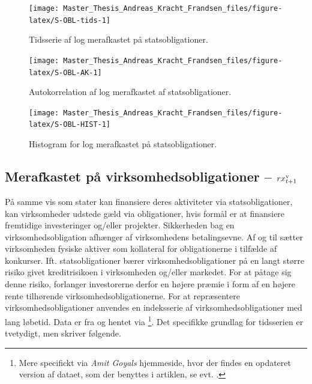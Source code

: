 \documentclass[
  a4paper,
  oneside]{memoir}
\begin{document}
\begin{figure}[H]

{\centering \texttt{[image: Master\_Thesis\_Andreas\_Kracht\_Frandsen\_files/figure-latex/S-OBL-tids-1]} 

}

\caption{Tidsserie af log merafkastet på statsobligationer.}\label{fig:S-OBL-tids}
\end{figure}

\begin{figure}[H]

{\centering \texttt{[image: Master\_Thesis\_Andreas\_Kracht\_Frandsen\_files/figure-latex/S-OBL-AK-1]} 

}

\caption{Autokorrelation af log merafkastet af statsobligationer.}\label{fig:S-OBL-AK}
\end{figure}

\begin{figure}[H]

{\centering \texttt{[image: Master\_Thesis\_Andreas\_Kracht\_Frandsen\_files/figure-latex/S-OBL-HIST-1]} 

}

\caption{Histogram for log merafkastet på statsobligationer.}\label{fig:S-OBL-HIST}
\end{figure}

\hypertarget{merafkastet-puxe5-virksomhedsobligationer-rx_t1textnormalv}{%
\subsection{\texorpdfstring{Merafkastet på virksomhedsobligationer -- \(rx_{t+1}^{\textnormal{v}}\)}{Merafkastet på virksomhedsobligationer -- rx\_\{t+1\}\^{}\{\textbackslash textnormal\{v\}\}}}\label{merafkastet-puxe5-virksomhedsobligationer-rx_t1textnormalv}}

På samme vis som stater kan finansiere deres aktiviteter via statsobligationer, kan virksomheder udstede gæld via obligationer, hvis formål er at finansiere fremtidige investeringer og/eller projekter. Sikkerheden bag en virksomhedsobligation afhænger af virksomhedens betalingsevne. Af og til sætter virksomheden fysiske aktiver som kollateral for obligationerne i tilfælde af konkurser. Ift. statsobligationer bærer virksomhedsobligationer på en langt større risiko givet kreditrisikoen i virksomheden og/eller markedet. For at påtage sig denne risiko, forlanger investorerne derfor en højere præmie i form af en højere rente tilhørende virksomhedsobligationerne. For at repræsentere virksomhedsobligationer anvendes en indeksserie af virksomhedsobligationer med lang løbetid. Data er fra \citep{Ibbotson2019} og hentet via \citep{Goyal2007}\footnote{Mere specifickt via \emph{Amit Goyals} hjemmeside, hvor der findes en opdateret version af dataet, som der benyttes i artiklen, se evt. \citep{Goyal2020}.}. Det specifikke grundlag for tidsserien er tvetydigt, men \citep{Ibbotson2019} skriver følgende.
\end{document}
